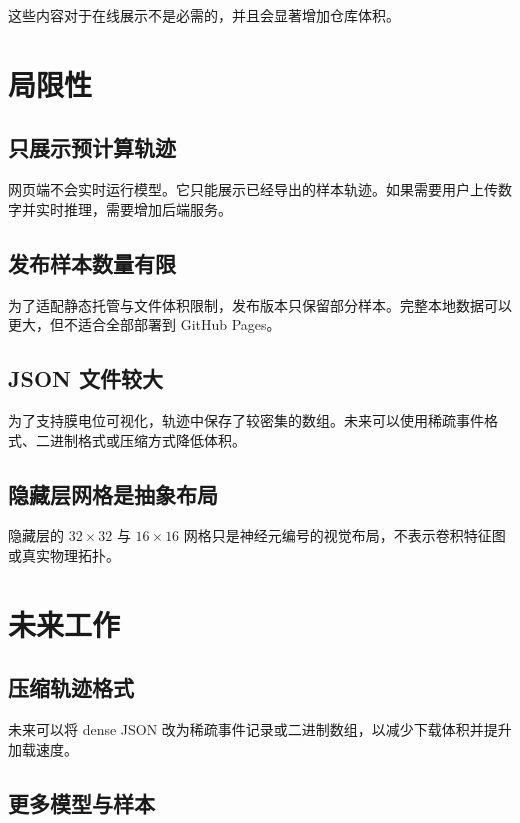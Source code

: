 \documentclass[UTF8,11pt,a4paper]{ctexart}
\begin{document}
这些内容对于在线展示不是必需的，并且会显著增加仓库体积。

\section{局限性}

\subsection{只展示预计算轨迹}

网页端不会实时运行模型。它只能展示已经导出的样本轨迹。如果需要用户上传数字并实时推理，需要增加后端服务。

\subsection{发布样本数量有限}

为了适配静态托管与文件体积限制，发布版本只保留部分样本。完整本地数据可以更大，但不适合全部部署到 GitHub Pages。

\subsection{JSON 文件较大}

为了支持膜电位可视化，轨迹中保存了较密集的数组。未来可以使用稀疏事件格式、二进制格式或压缩方式降低体积。

\subsection{隐藏层网格是抽象布局}

隐藏层的 $32\times32$ 与 $16\times16$ 网格只是神经元编号的视觉布局，不表示卷积特征图或真实物理拓扑。

\section{未来工作}

\subsection{压缩轨迹格式}

未来可以将 dense JSON 改为稀疏事件记录或二进制数组，以减少下载体积并提升加载速度。

\subsection{更多模型与样本}
\end{document}
